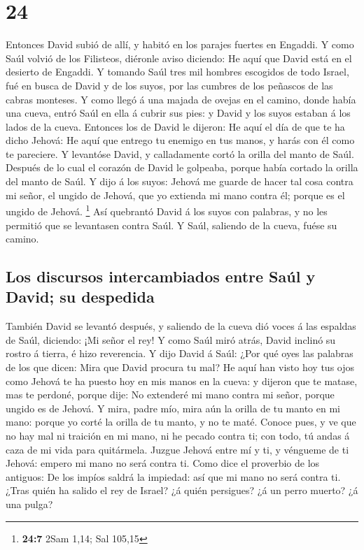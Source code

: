 \hypertarget{section-23}{%
\section{24}\label{section-23}}

 Entonces David subió de allí, y habitó en los parajes
fuertes en Engaddi.  Y como Saúl volvió de los Filisteos,
diéronle aviso diciendo: He aquí que David está en el desierto de
Engaddi.  Y tomando Saúl tres mil hombres escogidos de
todo Israel, fué en busca de David y de los suyos, por las cumbres de
los peñascos de las cabras monteses.  Y como llegó á una
majada de ovejas en el camino, donde había una cueva, entró Saúl en ella
á cubrir sus pies: y David y los suyos estaban á los lados de la cueva.
 Entonces los de David le dijeron: He aquí el día de que
te ha dicho Jehová: He aquí que entrego tu enemigo en tus manos, y harás
con él como te pareciere. Y levantóse David, y calladamente cortó la
orilla del manto de Saúl.  Después de lo cual el corazón
de David le golpeaba, porque había cortado la orilla del manto de Saúl.
 Y dijo á los suyos: Jehová me guarde de hacer tal cosa
contra mi señor, el ungido de Jehová, que yo extienda mi mano contra él;
porque es el ungido de Jehová. \footnote{\textbf{24:7} 2Sam 1,14; Sal
  105,15}  Así quebrantó David á los suyos con palabras, y
no les permitió que se levantasen contra Saúl. Y Saúl, saliendo de la
cueva, fuése su camino.

\hypertarget{los-discursos-intercambiados-entre-sauxfal-y-david-su-despedida}{%
\subsection{Los discursos intercambiados entre Saúl y David; su
despedida}\label{los-discursos-intercambiados-entre-sauxfal-y-david-su-despedida}}

 También David se levantó después, y saliendo de la cueva
dió voces á las espaldas de Saúl, diciendo: ¡Mi señor el rey! Y como
Saúl miró atrás, David inclinó su rostro á tierra, é hizo reverencia.
 Y dijo David á Saúl: ¿Por qué oyes las palabras de los
que dicen: Mira que David procura tu mal?  He aquí han
visto hoy tus ojos como Jehová te ha puesto hoy en mis manos en la
cueva: y dijeron que te matase, mas te perdoné, porque dije: No
extenderé mi mano contra mi señor, porque ungido es de Jehová.
 Y mira, padre mío, mira aún la orilla de tu manto en mi
mano: porque yo corté la orilla de tu manto, y no te maté. Conoce pues,
y ve que no hay mal ni traición en mi mano, ni he pecado contra ti; con
todo, tú andas á caza de mi vida para quitármela.  Juzgue
Jehová entre mí y ti, y véngueme de ti Jehová: empero mi mano no será
contra ti.  Como dice el proverbio de los antiguos: De
los impíos saldrá la impiedad: así que mi mano no será contra ti.
 ¿Tras quién ha salido el rey de Israel? ¿á quién
persigues? ¿á un perro muerto? ¿á una pulga?

